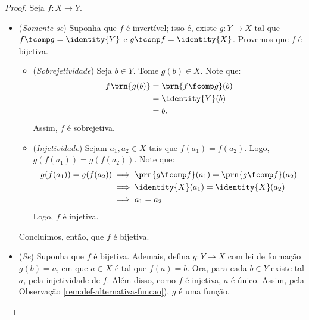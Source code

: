 \begin{proof}
    Seja  $f: X \to Y$.
    \begin{itemize}
        \item (\emph{Somente se}) Suponha que $f$ é invertível; isso é, existe $g : Y \to X$ tal que $f \fcomp g = \identity{Y}$ e $g \fcomp f = \identity{X}$.
        Provemos que $f$ é bijetiva. 
        \begin{itemize}
            \item (\emph{Sobrejetividade}) Seja $b \in Y$.
            Tome $g(b)\in X$.
            Note que:
            \begin{align*}
                f\prn{g(b)} &= \prn{f \fcomp g}(b) \\ &= \identity{Y}(b) \\ &= b.
            \end{align*}
            Assim, $f$ é sobrejetiva.
            \item (\emph{Injetividade}) Sejam $a_1, a_2 \in X$ tais que $f(a_1)=f(a_2)$.
            Logo, $g(f(a_1))=g(f(a_2))$.
            Note que:
            \begin{align*}
                g(f(a_1))=g(f(a_2)) & \implies \prn{g \fcomp f}(a_1) = \prn{g \fcomp f}(a_2) \\
                & \implies \identity{X}(a_1) = \identity{X}(a_2) \\
                & \implies a_1 = a_2
            \end{align*}
            Logo, $f$ é injetiva.
        \end{itemize}
        Concluímos, então, que $f$ é bijetiva.
        \item (\emph{Se}) Suponha que $f$ é bijetiva.
        Ademais, defina $g: Y \to X$ com lei de formação $g(b)=a$, em que $a \in X$ é tal que $f(a)=b$.
        Ora, para cada $b \in Y$ existe tal $a$, pela injetividade de $f$.
        Além disso, como $f$ é injetiva, $a$ é único. 
        Assim, pela Observação \ref{rem:def-alternativa-funcao}), $g$ é uma função.


\end{itemize}
\end{proof}
